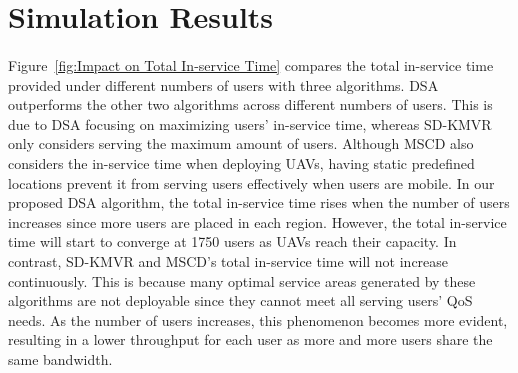 \documentclass[a4paper,12pt]{report}
\begin{document}
\section{Simulation Results}
\paragraph{}
Figure~\ref{fig:Impact on Total In-service Time} compares the total in-service time provided under different numbers of users with three algorithms. DSA outperforms the other two algorithms across different numbers of users. This is due to DSA focusing on maximizing users' in-service time, whereas SD-KMVR only considers serving the maximum amount of users. Although MSCD also considers the in-service time when deploying UAVs, having static predefined locations prevent it from serving users effectively when users are mobile. In our proposed DSA algorithm, the total in-service time rises when the number of users increases since more users are placed in each region. However, the total in-service time will start to converge at 1750 users as UAVs reach their capacity. In contrast, SD-KMVR and MSCD's total in-service time will not increase continuously. This is because many optimal service areas generated by these algorithms are not deployable since they cannot meet all serving users' QoS needs. As the number of users increases, this phenomenon becomes more evident, resulting in a lower throughput for each user as more and more users share the same bandwidth.
\end{document}
